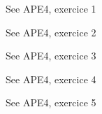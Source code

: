 \begin{solution}
See APE4, exercice 1
\end{solution}
\begin{solution}
See APE4, exercice 2
\end{solution}
\begin{solution}
See APE4, exercice 3
\end{solution}
\begin{solution}
See APE4, exercice 4
\end{solution}
\begin{solution}
See APE4, exercice 5
\end{solution}
